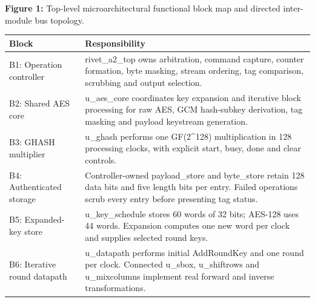 \documentclass[11pt,a4paper]{article}
\begin{document}
\begin{center}
\begin{minipage}{\textwidth}
\par\vspace{3pt}

{\small\textbf{Figure 1:} Top-level microarchitectural functional block map and directed inter-module bus topology.}\end{minipage}\end{center}

{\small\renewcommand{\arraystretch}{1.18}\begin{longtable}{@{}L{0.24\textwidth}|L{0.7\textwidth}@{}}\toprule

\textbf{Block} & \textbf{Responsibility}\\\midrule\endhead

B1: Operation controller & rivet\_\allowbreak{}a2\_\allowbreak{}top owns arbitration,\allowbreak{} command capture,\allowbreak{} counter formation,\allowbreak{} byte masking,\allowbreak{} stream ordering,\allowbreak{} tag comparison,\allowbreak{} scrubbing and output selection.\\[2pt]\hline

B2: Shared AES core & u\_\allowbreak{}aes\_\allowbreak{}core coordinates key expansion and iterative block processing for raw AES,\allowbreak{} GCM hash-subkey derivation,\allowbreak{} tag masking and payload keystream generation.\\[2pt]\hline

B3: GHASH multiplier & u\_\allowbreak{}ghash performs one GF(\allowbreak{}2\textasciicircum{}128)\allowbreak{} multiplication in 128 processing clocks,\allowbreak{} with explicit start,\allowbreak{} busy,\allowbreak{} done and clear controls.\\[2pt]\hline

B4: Authenticated storage & Controller-owned payload\_\allowbreak{}store and byte\_\allowbreak{}store retain 128 data bits and five length bits per entry. Failed operations scrub every entry before presenting tag status.\\[2pt]\hline

B5: Expanded-key store & u\_\allowbreak{}key\_\allowbreak{}schedule stores 60 words of 32 bits; AES-128 uses 44 words. Expansion computes one new word per clock and supplies selected round keys.\\[2pt]\hline

B6: Iterative round datapath & u\_\allowbreak{}datapath performs initial AddRoundKey and one round per clock. Connected u\_\allowbreak{}sbox,\allowbreak{} u\_\allowbreak{}shiftrows and u\_\allowbreak{}mixcolumns implement real forward and inverse transformations.\\[2pt]\hline

\bottomrule\end{longtable}}
\end{document}
